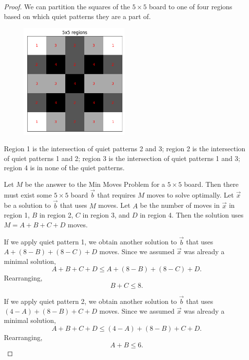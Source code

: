 \documentclass[a4paper]{article}
\begin{document}
\begin{proof}
		We can partition the squares of the $5 \times 5$ board to one of four regions based on which quiet patterns they are a part of.
		
		\begin{figure}[H]
		\begin{center}
			\includegraphics[width=0.49\textwidth]{../../code/serialization/regions/5x5_regions.png}
		\end{center}
		\end{figure}
	
		Region 1 is the intersection of quiet patterns 2 and 3; region 2 is the intersection of quiet patterns 1 and 2; region 3 is the intersection of quiet patterns 1 and 3;
		region 4 is in none of the quiet patterns.
		
		Let $M$ be the answer to the Min Moves Problem for a $5 \times 5$ board.
		Then there must exist some $5 \times 5$ board $\vec{b}$ that requires $M$ moves to solve optimally.
		Let $\vec{x}$ be a solution to $\vec{b}$ that uses $M$ moves.
		Let $A$ be the number of moves in $\vec{x}$ in region 1, $B$ in region 2, $C$ in region 3, and $D$ in region 4.
		Then the solution uses $M = A + B + C + D$ moves.
		
		If we apply quiet pattern 1, we obtain another solution to $\vec{b}$ that uses $A + (8 - B) + (8 - C) + D$ moves.
		Since we assumed $\vec{x}$ was already a minimal solution,
		\begin{equation*}
			A + B + C + D \leq A + (8 - B) + (8 - C) + D.
		\end{equation*}
		Rearranging,
		\begin{equation}\label{5x5_constr1}
			B + C \leq 8.
		\end{equation}
	
		If we apply quiet pattern 2, we obtain another solution to $\vec{b}$ that uses $(4 - A) + (8 - B) + C + D$ moves.
		Since we assumed $\vec{x}$ was already a minimal solution,
		\begin{equation*}
			A + B + C + D \leq (4 - A) + (8 - B) + C + D.
		\end{equation*}
		Rearranging,
		\begin{equation}\label{5x5_constr2}
			A + B \leq 6.
		\end{equation}
	

\end{proof}
\end{document}
